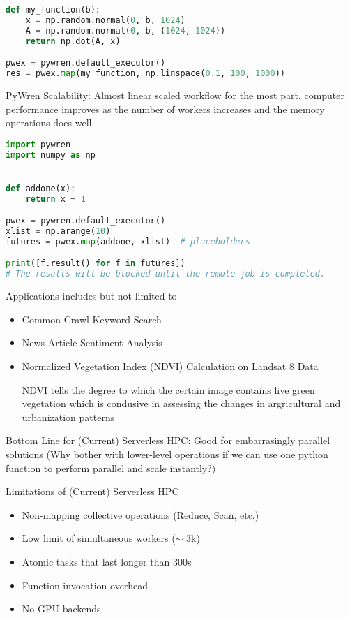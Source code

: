 \documentclass{article}
\begin{document}
\begin{lstlisting}[language=Python]
def my_function(b):
    x = np.random.normal(0, b, 1024)
    A = np.random.normal(0, b, (1024, 1024))
    return np.dot(A, x)

pwex = pywren.default_executor()
res = pwex.map(my_function, np.linspace(0.1, 100, 1000))    
\end{lstlisting}

PyWren Scalability: Almost linear scaled workflow for the most part, computer performance improves as the number of workers increases and the memory operations does well.

\begin{lstlisting}[language=Python]
import pywren
import numpy as np


def addone(x):
    return x + 1

pwex = pywren.default_executor()
xlist = np.arange(10)
futures = pwex.map(addone, xlist)  # placeholders

print([f.result() for f in futures])
# The results will be blocked until the remote job is completed.
\end{lstlisting}

Applications includes but not limited to

\begin{itemize}
    \item Common Crawl Keyword Search
    \item News Article Sentiment Analysis
    \item Normalized Vegetation Index (NDVI) Calculation on Landsat 8 Data

    NDVI tells the degree to which the certain image contains live green vegetation which is condusive in assessing the changes in argricultural and urbanization patterns
\end{itemize}

Bottom Line for (Current) Serverless HPC: Good for embarrasingly parallel solutions (Why bother with lower-level operations if we can use one python function to perform parallel and scale instantly?)

Limitations of (Current) Serverless HPC

\begin{itemize}
    \item Non-mapping collective operations (Reduce, Scan, etc.)
    \item Low limit of simultaneous workers ($\sim$ 3k)
    \item Atomic tasks that last longer than 300s
    \item Function invocation overhead
    \item No GPU backends
\end{itemize}
\end{document}
